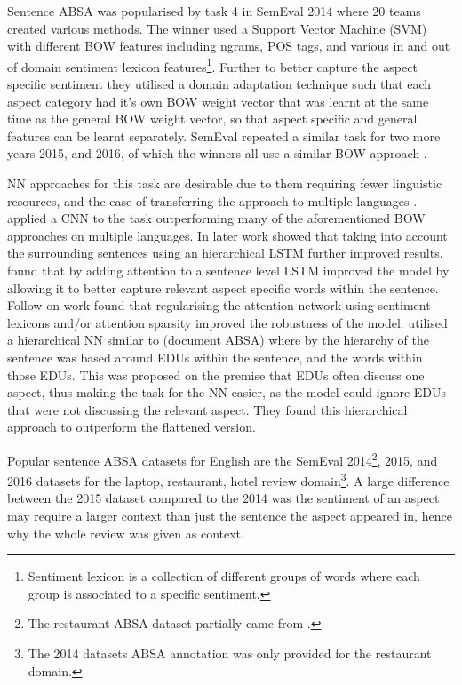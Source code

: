 Sentence ABSA was popularised by task 4 in SemEval 2014 \citep{pontiki-etal-2014-semeval} where 20 teams created various methods. The winner \citet{kiritchenko-etal-2014-nrc} used a Support Vector Machine (SVM) \citep{chang2011libsvm} with different BOW features including ngrams, POS tags, and various in and out of domain sentiment lexicon features\footnote{Sentiment lexicon is a collection of different groups of words where each group is associated to a specific sentiment.}. Further to better capture the aspect specific sentiment they utilised a domain adaptation technique \citep{daume-iii-2007-frustratingly} such that each aspect category had it's own BOW weight vector that was learnt at the same time as the general BOW weight vector, so that aspect specific and general features can be learnt separately. SemEval repeated a similar task for two more years 2015, and 2016, of which the winners all use a similar BOW approach \citep{saias-2015-sentiue, brun-etal-2016-xrce, kumar-etal-2016-iit}. 

NN approaches for this task are desirable due to them requiring fewer linguistic resources, and the ease of transferring the approach to multiple languages \citep{ruder-etal-2016-insight-1}. \citet{ruder-etal-2016-insight-1} applied a CNN to the task outperforming many of the aforementioned BOW approaches on multiple languages. In later work \citet{ruder-etal-2016-hierarchical} showed that taking into account the surrounding sentences using an hierarchical LSTM further improved results. \citet{wang-etal-2016-attention} found that by adding attention to a sentence level LSTM improved the model by allowing it to better capture relevant aspect specific words within the sentence. Follow on work \citep{bao-etal-2019-attention} found that regularising the attention network using sentiment lexicons and/or attention sparsity improved the robustness of the model. \citet{wang2018aspect} utilised a hierarchical NN similar to \citet{yin-etal-2017-document} (document ABSA) where by the hierarchy of the sentence was based around EDUs within the sentence, and the words within those EDUs. This was proposed on the premise that EDUs often discuss one aspect, thus making the task for the NN easier, as the model could ignore EDUs that were not discussing the relevant aspect. They found this hierarchical approach to outperform the flattened version.

Popular sentence ABSA datasets for English are the SemEval 2014\footnote{The restaurant ABSA dataset partially came from \citet{Ganu2009BeyondTS}.}\citep{pontiki-etal-2014-semeval}, 2015\citep{pontiki-etal-2015-semeval}, and 2016 datasets for the laptop, restaurant, hotel review domain\footnote{The 2014 datasets ABSA annotation was only provided for the restaurant domain.}. A large difference between the 2015 dataset compared to the 2014 was the sentiment of an aspect may require a larger context than just the sentence the aspect appeared in, hence why the whole review was given as context.   


